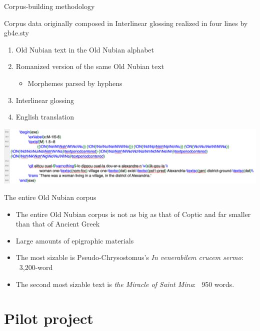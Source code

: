 \documentclass{beamer}
\begin{document}
\begin{frame}{Corpus-building methodology}
  \begin{block}{Corpus data originally composed in \XeLaTeX}
    Interlinear glossing realized in four lines by gb4e.sty 
    \begin{enumerate}
      \item Old Nubian text in the Old Nubian alphabet 
      \item Romanized version of the same Old Nubian text 
      \begin{itemize}\item Morphemes parsed by hyphens \end{itemize}
      \item Interlinear glossing
      \item  English translation
    \end{enumerate} 
  \end{block}
\begin{center}
\includegraphics[width=1.0\textwidth]{xelatex.png}
\end{center}
\end{frame}

\begin{frame}{The entire Old Nubian corpus}
\begin{itemize}
\item The entire Old Nubian corpus is not as big as that of Coptic and far smaller than that of Ancient Greek 
\item Large amounts of epigraphic materials 
\item The most sizable is Pseudo-Chrysostomus’s {\it In venerabilem crucem sermo}: ~3,200-word 
\item The second most sizable text is {\it the Miracle of Saint Mina}: ~950 words. 
\end{itemize}
\end{frame}

\section{Pilot project}
\end{document}
